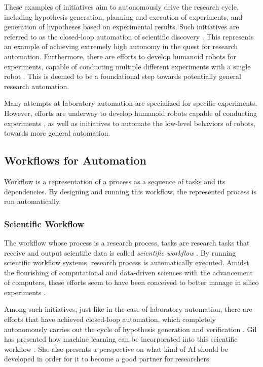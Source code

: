 These examples of initiatives aim to autonomously drive the research cycle, including hypothesis generation, planning and execution of experiments, and generation of hypotheses based on experimental results. Such initiatives are referred to as the closed-loop automation of scientific discovery     \cite{burger2020mobile,king2004functional}. This represents an example of achieving extremely high autonomy in the quest for research automation. Furthermore, there are efforts to develop humanoid robots for experiments, capable of conducting multiple different experiments with a single robot \cite{yachie2017robotic}. This is deemed to be a foundational step towards potentially general research automation.

Many attempts at laboratory automation are specialized for specific experiments. However, efforts are underway to develop humanoid robots capable of conducting experiments \cite{yachie2017robotic}, as well as initiatives to automate the low-level behaviors of robots, towards more general automation.


\subsection{Workflows for Automation}
Workflow is a representation of a process as a sequence of tasks and its dependencies. By designing and running this workflow, the represented process is run automatically.

\subsubsection{Scientific Workflow}
The workflow whose process is a research process, tasks are research tasks that receive and output scientific data is called \textit{scientific workflow} \cite{ludascher2009scientific}. By running scientific workflow systems, research process is automatically executed.  Amidst the flourishing of computational and data-driven sciences with the advancement of computers, these efforts seem to have been conceived to better manage in silico experiments \cite{liew2016scientific}. 

Among such initiatives, just like in the case of laboratory automation, there are efforts that have achieved closed-loop automation, which completely autonomously carries out the cycle of hypothesis generation and verification \cite{gil2017towards}. Gil has presented how machine learning can be incorporated into this scientific workflow \cite{gil2022will}. She also presents a perspective on what kind of AI should be developed in order for it to become a good partner for researchers.

